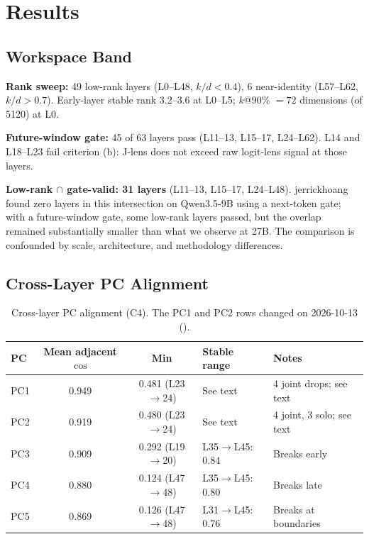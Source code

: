 \documentclass[11pt,a4paper]{article}
\begin{document}
\section{Results}

\subsection{Workspace Band}

\textbf{Rank sweep:} 49 low-rank layers (L0--L48, $k/d < 0.4$), 6 near-identity (L57--L62, $k/d > 0.7$). Early-layer stable rank 3.2--3.6 at L0--L5; $k$@90\% $= 72$ dimensions (of 5120) at L0.

\textbf{Future-window gate:} 45 of 63 layers pass (L11--13, L15--17, L24--L62). L14 and L18--L23 fail criterion (b): J-lens does not exceed raw logit-lens signal at those layers.

\textbf{Low-rank $\cap$ gate-valid: 31 layers} (L11--13, L15--17, L24--L48). jerrickhoang~\cite{jerrickhoang2026} found zero layers in this intersection on Qwen3.5-9B using a next-token gate; with a future-window gate, some low-rank layers passed, but the overlap remained substantially smaller than what we observe at 27B. The comparison is confounded by scale, architecture, and methodology differences.

\subsection{Cross-Layer PC Alignment}

\begin{table}[H]
\centering
\caption{Cross-layer PC alignment (C4). The PC1 and PC2 rows changed on 2026-10-13 ().}
\label{tab:alignment}
\begin{tabular}{lccll}
\toprule
PC & Mean adjacent $\cos$ & Min & Stable range & Notes \\
\midrule
PC1 & 0.949 & 0.481 (L23$\to$24) & See text & 4 joint drops; see text \\
PC2 & 0.919 & 0.480 (L23$\to$24) & See text & 4 joint, 3 solo; see text \\
PC3 & 0.909 & 0.292 (L19$\to$20) & L35$\to$L45: 0.84 & Breaks early \\
PC4 & 0.880 & 0.124 (L47$\to$48) & L35$\to$L45: 0.80 & Breaks late \\
PC5 & 0.869 & 0.126 (L47$\to$48) & L31$\to$L45: 0.76 & Breaks at boundaries \\
\bottomrule
\end{tabular}
\end{table}
\end{document}
